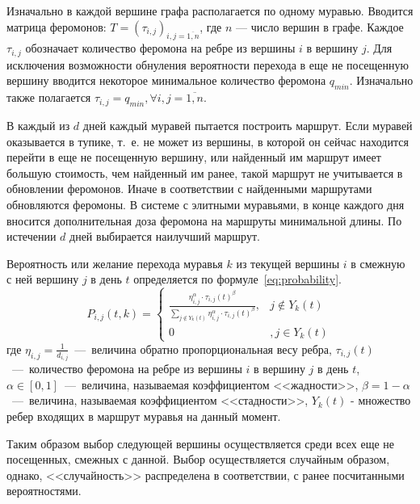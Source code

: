 Изначально в каждой вершине графа располагается по одному муравью. Вводится матрица феромонов: $T = (\tau_{i, j})_{i, j = \overline{1, n}}$, где $n$ --- число вершин в графе. Каждое $\tau_{i, j}$ обозначает количество феромона на ребре из вершины $i$ в вершину $j$. Для исключения возможности обнуления вероятности перехода в еще не посещенную вершину вводится некоторое минимальное количество феромона $q_{min}$. Изначально также полагается $\tau_{i, j} = q_{min}, \forall i, j  = \overline{1, n}$.

В каждый из $d$ дней каждый муравей пытается построить маршрут. Если муравей оказывается в тупике, т.~е. не может из вершины, в которой он сейчас находится перейти в еще не посещенную вершину, или найденный им маршрут имеет большую стоимость, чем найденный им ранее, такой маршрут не учитывается в обновлении феромонов. Иначе в соответствии с найденными маршрутами обновляются феромоны. В системе с элитными муравьями, в конце каждого дня вносится дополнительная доза феромона на маршруты минимальной длины. По истечении $d$ дней выбирается наилучший маршрут.

Вероятность или желание перехода муравья $k$ из текущей вершины $i$ в смежную с ней вершину $j$ в день $t$ определяется по формуле~\ref{eq:probability}.
\begin{equation}
	\label{eq:probability}
    P_{i, j}(t, k) = \begin{cases}
        \frac{\eta_{i,j}^{\alpha} \cdot \tau_{i, j}(t)^{\beta}}{\displaystyle\sum_{j\notin Y_{k}(t)}\eta_{i, j}^{\alpha}\cdot\tau_{i,j}(t)^{\beta}}, & j \notin Y_{k}(t) \\
        0&, j \in Y_{k}(t)
    \end{cases}
\end{equation}
где $\eta_{i,j}=\frac{1}{d_{i,j}}$~---~величина обратно пропорциональная весу ребра, $\tau_{i,j}(t)$~---~количество феромона на ребре из вершины $i$ в вершину $j$ в день $t$, $\alpha \in [0, 1]$~---~величина, называемая коэффициентом <<жадности>>, $\beta = 1 - \alpha$~---~величина, называемая коэффициентом <<стадности>>,  $Y_{k}(t)$ - множество ребер входящих в маршрут муравья на данный момент.

Таким образом выбор следующей вершины осуществляется среди всех еще не посещенных, смежных с данной. Выбор осуществляется случайным образом, однако, <<случайность>> распределена в соответствии, с ранее посчитанными вероятностями.

